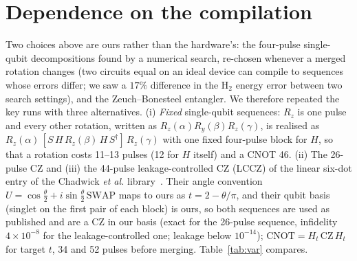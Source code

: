 \documentclass[reprint,aps,pra,amsmath,amssymb,superscriptaddress,letterpaper]{revtex4-2}
\newcommand{\Hz}{\mathrm{H}_2}
\begin{document}
\section{Dependence on the compilation}
\label{sec:variants}

Two choices above are ours rather than the hardware's: the four-pulse
single-qubit decompositions found by a numerical search, re-chosen whenever a
merged rotation changes (two circuits equal on an ideal device can compile to
sequences whose errors differ; we saw a $17\%$ difference in the $\Hz$ energy error between
two search settings), and the Zeuch--Bonesteel entangler. We therefore
repeated the key runs with three alternatives. (i) \emph{Fixed} single-qubit sequences: $R_z$ is one pulse and every other rotation, written as $R_z(\alpha)R_y(\beta)R_z(\gamma)$, is realised as $R_z(\alpha)\,[S\,H\,R_z(\beta)\,H\,S^\dagger]\,R_z(\gamma)$ with one fixed four-pulse block for $H$, so that a rotation costs 11--13 pulses (12 for $H$ itself) and a CNOT 46. (ii) The 26-pulse CZ and (iii) the 44-pulse leakage-controlled CZ (LCCZ)
of the linear six-dot entry of the Chadwick \emph{et al.}
library~\cite{chadwickdata}. Their angle convention $U=\cos\tfrac\theta2+
i\sin\tfrac\theta2\,\mathrm{SWAP}$ maps to ours as $t=2-\theta/\pi$, and their
qubit basis (singlet on the first pair of each block) is ours, so both sequences
are used as published and are a CZ in our basis (exact for the 26-pulse sequence, infidelity $4\times10^{-8}$ for the leakage-controlled one; leakage below $10^{-14}$); $\mathrm{CNOT}=H_t\,\mathrm{CZ}\,H_t$ for target $t$, 34 and 52
pulses before merging. Table~\ref{tab:var}
compares.
\end{document}
